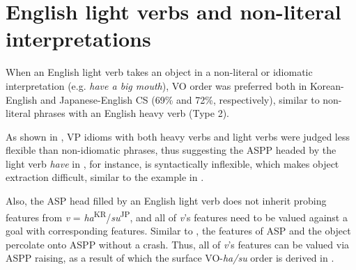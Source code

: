 \ea\label{ex:121}
\z

\section{English light verbs and non-literal interpretations}\label{ch5:sect:5.4}

When an English light verb takes an object in a non-literal or idiomatic interpretation (e.g. \textit{have a big mouth}), \ac{VO} order was preferred both in Korean-English and Japanese-English \ac{CS} (69\% and 72\%, respectively), similar to non-literal phrases with an English heavy verb (Type 2). 

As shown in , \acs{VP} idioms with both heavy verbs and light verbs were judged less flexible than non-idiomatic phrases, thus suggesting the \ac{ASP}P headed by the light verb \textit{have} in , for instance, is syntactically inflexible, which makes object extraction difficult, similar to the example in .

\ea\label{ex:122}
\z

Also, the \ac{ASP} head filled by an English light verb does not inherit probing features from \textit{v} = \textit{ha}\textsuperscript{\MakeUppercase{kr}}/\textit{su}\textsuperscript{\MakeUppercase{jp}}\MakeUppercase{,} and all of \textit{v}’s features need to be valued against a goal with corresponding features. Similar to , the features of \ac{ASP} and the object percolate onto \ac{ASP}P without a crash. Thus, all of \textit{v}’s features can be valued via \ac{ASP}P raising, as a result of which the surface \ac{VO}-\textit{ha/su} order is derived in .

